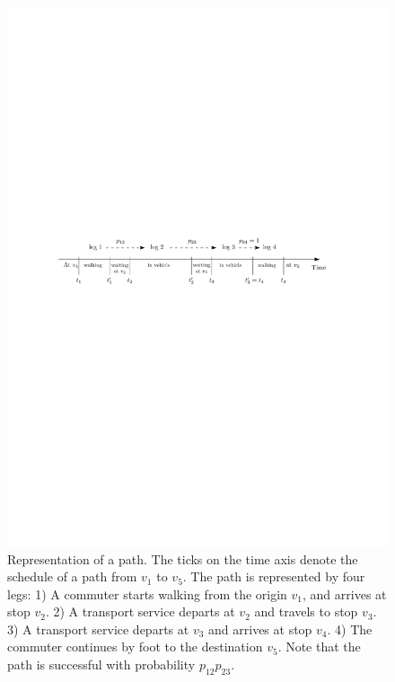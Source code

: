 \documentclass[dissertation,draft*]{aaltoseries}
\begin{document}
\begin{figure}[ht]
\begin{center}
\includegraphics[width=0.8\columnwidth]{journey02b}
\end{center}
\caption{Representation of a path. The ticks on the time axis denote the 
schedule of a path from $v_1$ to $v_5$. The path is represented by four legs: 
1) A commuter starts walking from the origin $v_1$, and arrives at stop $v_2$. 
2) A transport service departs at $v_2$ and travels to stop $v_3$. 
3) A transport service departs at $v_3$ and arrives at stop $v_4$. 
4) The commuter continues by foot to the destination $v_5$. Note that the path is successful
with probability $p_{12}p_{23}$.
}
\label{journey01}
\end{figure}

\end{document}
